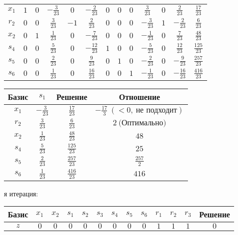 \documentclass{article}%
\begin{document}
\begin{flushleft}
\begin{tabular}{|c|ccccccccccc|c|}
\hline%
$x_{1}$&$1$&$0$&$-\frac{3}{23}$&$0$&$-\frac{2}{23}$&$0$&$0$&$0$&$\frac{3}{23}$&$0$&$\frac{2}{23}$&$\frac{17}{23}$\\%
$r_{2}$&$0$&$0$&$\frac{3}{23}$&$-1$&$\frac{2}{23}$&$0$&$0$&$0$&$-\frac{3}{23}$&$1$&$-\frac{2}{23}$&$\frac{6}{23}$\\%
$x_{2}$&$0$&$1$&$\frac{1}{23}$&$0$&$-\frac{7}{23}$&$0$&$0$&$0$&$-\frac{1}{23}$&$0$&$\frac{7}{23}$&$\frac{48}{23}$\\%
$s_{4}$&$0$&$0$&$\frac{5}{23}$&$0$&$-\frac{12}{23}$&$1$&$0$&$0$&$-\frac{5}{23}$&$0$&$\frac{12}{23}$&$\frac{125}{23}$\\%
$s_{5}$&$0$&$0$&$\frac{2}{23}$&$0$&$\frac{9}{23}$&$0$&$1$&$0$&$-\frac{2}{23}$&$0$&$-\frac{9}{23}$&$\frac{257}{23}$\\%
$s_{6}$&$0$&$0$&$\frac{1}{23}$&$0$&$\frac{16}{23}$&$0$&$0$&$1$&$-\frac{1}{23}$&$0$&$-\frac{16}{23}$&$\frac{416}{23}$\\%
\hline%
\end{tabular}%
\newline%
\newline%
\newline%
\begin{tabular}{|cccc|}%
\hline%
Базис&$s_{1}$&Решение&Отношение\\%
\hline%
$x_{1}$&$-\frac{3}{23}$&$\frac{17}{23}$&$-\frac{17}{3}\: (< 0, \: \text{не подходит})$\\%
$r_{2}$&$\frac{3}{23}$&$\frac{6}{23}$&$2\: \text{(Оптимально)}$\\%
$x_{2}$&$\frac{1}{23}$&$\frac{48}{23}$&$48$\\%
$s_{4}$&$\frac{5}{23}$&$\frac{125}{23}$&$25$\\%
$s_{5}$&$\frac{2}{23}$&$\frac{257}{23}$&$\frac{257}{2}$\\%
$s_{6}$&$\frac{1}{23}$&$\frac{416}{23}$&$416$\\%
\hline%
\end{tabular}%
\newline%
\newline%
я итерация: %
\newline%
\newline%
\renewcommand{\arraystretch}{1.3}%
\begin{tabular}{|c|ccccccccccc|c|}%
\hline%
Базис&$x_{1}$&$x_{2}$&$s_{1}$&$s_{2}$&$s_{3}$&$s_{4}$&$s_{5}$&$s_{6}$&$r_{1}$&$r_{2}$&$r_{3}$&Решение\\%
\hline%
$z$&$0$&$0$&$0$&$0$&$0$&$0$&$0$&$0$&$1$&$1$&$1$&$0$\\%

\end{tabular}
\end{flushleft}
\end{document}
